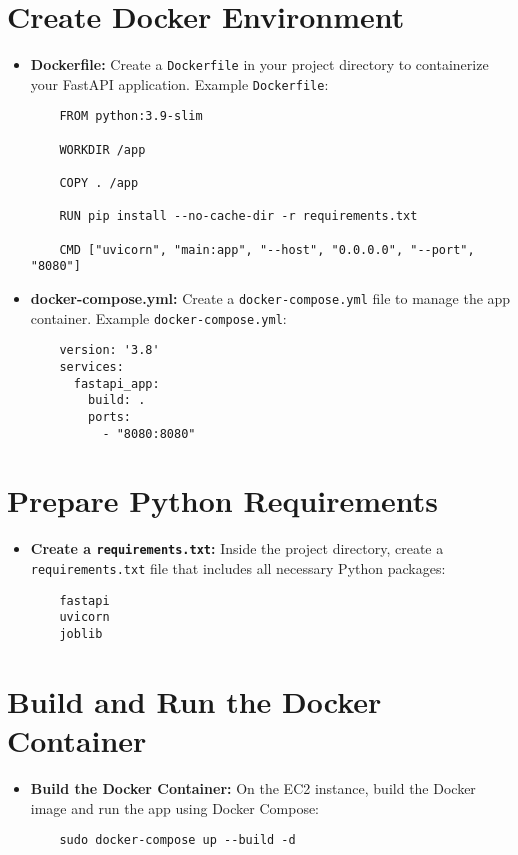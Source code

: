 \documentclass{article}
\begin{document}
\section{Create Docker Environment}
\begin{itemize}
    \item \textbf{Dockerfile:} Create a \texttt{Dockerfile} in your project directory to containerize your FastAPI application. Example \texttt{Dockerfile}:
    \begin{verbatim}
    FROM python:3.9-slim

    WORKDIR /app

    COPY . /app

    RUN pip install --no-cache-dir -r requirements.txt

    CMD ["uvicorn", "main:app", "--host", "0.0.0.0", "--port", "8080"]
    \end{verbatim}
    \item \textbf{docker-compose.yml:} Create a \texttt{docker-compose.yml} file to manage the app container. Example \texttt{docker-compose.yml}:
    \begin{verbatim}
    version: '3.8'
    services:
      fastapi_app:
        build: .
        ports:
          - "8080:8080"
    \end{verbatim}
\end{itemize}

\section{Prepare Python Requirements}
\begin{itemize}
    \item \textbf{Create a \texttt{requirements.txt}:} Inside the project directory, create a \texttt{requirements.txt} file that includes all necessary Python packages:
    \begin{verbatim}
    fastapi
    uvicorn
    joblib
    \end{verbatim}
\end{itemize}

\section{Build and Run the Docker Container}
\begin{itemize}
    \item \textbf{Build the Docker Container:} On the EC2 instance, build the Docker image and run the app using Docker Compose:
    \begin{verbatim}
    sudo docker-compose up --build -d
    \end{verbatim}
\end{itemize}
\end{document}
